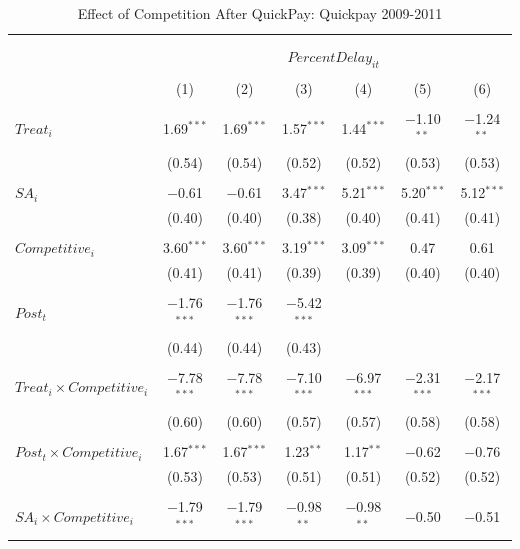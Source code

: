 \documentclass[
]{article}
\begin{document}
\begin{table}[H] \centering 
  \caption{Effect of Competition After QuickPay: Quickpay 2009-2011} 
  \label{} 
\small 
\begin{tabular}{@{\extracolsep{-3pt}}lcccccc} 
\\[-1.8ex]\hline 
\hline \\[-1.8ex] 
\\[-1.8ex] & \multicolumn{6}{c}{$PercentDelay_{it}$  } \\ 
\\[-1.8ex] & (1) & (2) & (3) & (4) & (5) & (6)\\ 
\hline \\[-1.8ex] 
 $Treat_i$ & 1.69$^{***}$ & 1.69$^{***}$ & 1.57$^{***}$ & 1.44$^{***}$ & $-$1.10$^{**}$ & $-$1.24$^{**}$ \\ 
  & (0.54) & (0.54) & (0.52) & (0.52) & (0.53) & (0.53) \\ 
  & & & & & & \\ 
 $SA_i$ & $-$0.61 & $-$0.61 & 3.47$^{***}$ & 5.21$^{***}$ & 5.20$^{***}$ & 5.12$^{***}$ \\ 
  & (0.40) & (0.40) & (0.38) & (0.40) & (0.41) & (0.41) \\ 
  & & & & & & \\ 
 $Competitive_i$ & 3.60$^{***}$ & 3.60$^{***}$ & 3.19$^{***}$ & 3.09$^{***}$ & 0.47 & 0.61 \\ 
  & (0.41) & (0.41) & (0.39) & (0.39) & (0.40) & (0.40) \\ 
  & & & & & & \\ 
 $Post_t$ & $-$1.76$^{***}$ & $-$1.76$^{***}$ & $-$5.42$^{***}$ &  &  &  \\ 
  & (0.44) & (0.44) & (0.43) &  &  &  \\ 
  & & & & & & \\ 
 $Treat_i \times Competitive_i$ & $-$7.78$^{***}$ & $-$7.78$^{***}$ & $-$7.10$^{***}$ & $-$6.97$^{***}$ & $-$2.31$^{***}$ & $-$2.17$^{***}$ \\ 
  & (0.60) & (0.60) & (0.57) & (0.57) & (0.58) & (0.58) \\ 
  & & & & & & \\ 
 $Post_t \times Competitive_i$ & 1.67$^{***}$ & 1.67$^{***}$ & 1.23$^{**}$ & 1.17$^{**}$ & $-$0.62 & $-$0.76 \\ 
  & (0.53) & (0.53) & (0.51) & (0.51) & (0.52) & (0.52) \\ 
  & & & & & & \\ 
 $SA_i \times Competitive_i$ & $-$1.79$^{***}$ & $-$1.79$^{***}$ & $-$0.98$^{**}$ & $-$0.98$^{**}$ & $-$0.50 & $-$0.51 \\ 

\end{tabular}
\end{table}
\end{document}
